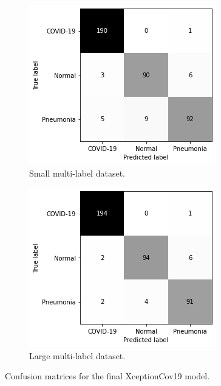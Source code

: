 \begin{figure}
    \begin{subfigure}[b]{0.49\textwidth}
        \centering
        \includegraphics[width=\textwidth]{figures/cm-orig-s-m.png}
        \caption{Small multi-label dataset.}
        \label{fig:cm-orig-s-m}
    \end{subfigure}
    \hfill
    \begin{subfigure}[b]{0.49\textwidth}
        \centering
        \includegraphics[width=\textwidth]{figures/cm-orig-l-m.png}
        \caption{Large multi-label dataset.}
        \label{fig:cm-orig-l-m}
    \end{subfigure}
    \caption{Confusion matrices for the final XceptionCov19 model.}
    \label{fig:cm-orig}
\end{figure}

